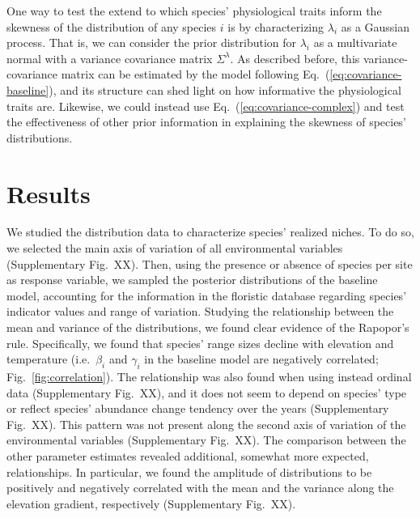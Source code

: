 \documentclass[11pt, a4paper]{article}
\begin{document}
One way to test the extend to which species' physiological traits inform the skewness of the distribution of any species $i$ is by characterizing $\lambda_{i}$ as a Gaussian process. That is, we can consider the prior distribution for $\lambda_{i}$ as a multivariate normal with a variance covariance matrix $\Sigma^{\lambda}$. As described before, this variance-covariance matrix can be estimated by the model following Eq.~(\ref{eq:covariance-baseline}), and its structure can shed light on how informative the physiological traits are. Likewise, we could instead use Eq.~(\ref{eq:covariance-complex}) and test the effectiveness of other prior information in explaining the skewness of species' distributions.


\section*{Results}
We studied the distribution data to characterize species' realized niches. To do so, we selected the main axis of variation of all environmental variables (Supplementary Fig.~XX). Then, using the presence or absence of species per site as response variable, we sampled the posterior distributions of the baseline model, accounting for the information in the floristic database regarding species' indicator values and range of variation. Studying the relationship between the mean and variance of the distributions, we found clear evidence of the Rapopor's rule. Specifically, we found that species' range sizes decline with elevation and temperature (i.e.~$\beta_{i}$ and $\gamma_{i}$ in the baseline model are negatively correlated; Fig.~\ref{fig:correlation}). The relationship was also found when using instead ordinal data (Supplementary Fig.~XX), and it does not seem to depend on species' type or reflect species' abundance change tendency over the years (Supplementary Fig.~XX). This pattern was not present along the second axis of variation of the environmental variables (Supplementary Fig.~XX). The comparison between the other parameter estimates revealed additional, somewhat more expected, relationships. In particular, we found the amplitude of distributions to be positively and negatively correlated with the mean and the variance along the elevation gradient, respectively (Supplementary Fig.~XX).
\end{document}

